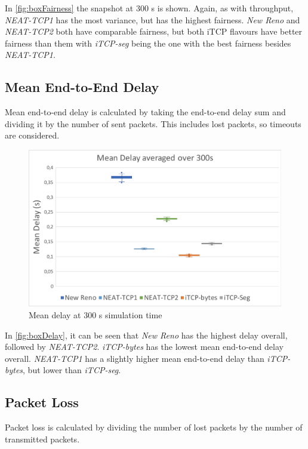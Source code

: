 In \autoref{fig:boxFairness} the snapshot at 300 s is shown. Again, as with throughput, \textit{NEAT-TCP1} has the most variance, but has the highest fairness. 
\textit{New Reno} and \textit{NEAT-TCP2} both have comparable fairness, but both iTCP flavours have better fairness than them with \textit{iTCP-seg} being the one with the best fairness besides \textit{NEAT-TCP1}.
\newpage


\subsection{Mean End-to-End Delay}\label{subsec:meanDelay}
Mean end-to-end delay is calculated by taking the end-to-end delay sum and dividing it by the number of sent packets. This includes lost packets, so timeouts are considered. 
\begin{figure}[h]
	\centering
	\includegraphics[width=1\textwidth]{boxDelay}
	\caption{Mean delay at 300 s simulation time}
	\label{fig:boxDelay}
\end{figure}
In \autoref{fig:boxDelay}, it can be seen that \textit{New Reno} has the highest delay overall, followed by \textit{NEAT-TCP2}. \textit{iTCP-bytes} has the lowest mean end-to-end delay overall. \textit{NEAT-TCP1} has a slightly higher mean end-to-end delay than \textit{iTCP-bytes}, but lower than \textit{iTCP-seg}.
\subsection{Packet Loss}\label{subsec:lostPacktes}
Packet loss is calculated by dividing the number of lost packets by the number of transmitted packets. 

